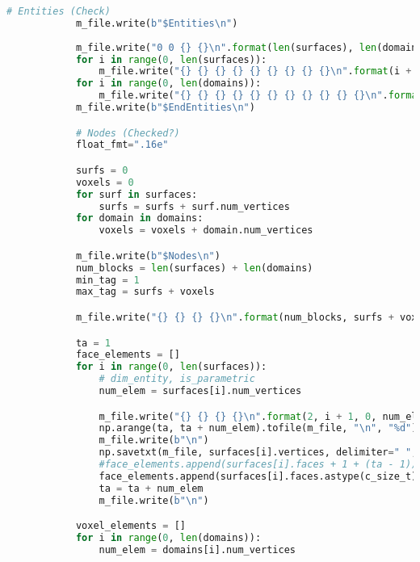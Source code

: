 \begin{lstlisting}[language=Python,caption={Class defining parsers and writers for commonly used file types. Here .gmsh and .poly are covered.},captionpos=b,label=lst:file_ops_class]
            # Entities (Check)
            m_file.write(b"$Entities\n")
            
            m_file.write("0 0 {} {}\n".format(len(surfaces), len(domains)).encode("utf-8"))
            for i in range(0, len(surfaces)):
                m_file.write("{} {} {} {} {} {} {} {} {}\n".format(i + 1, np.amin(surfaces[i].vertices[:, 0]), np.amin(surfaces[i].vertices[:, 1]), np.amin(surfaces[i].vertices[:, 2]), np.amax(surfaces[i].vertices[:, 0]), np.amax(surfaces[i].vertices[:, 1]), np.amax(surfaces[i].vertices[:, 2]), 0, 0).encode("utf-8"))
            for i in range(0, len(domains)):
                m_file.write("{} {} {} {} {} {} {} {} {} {} {}\n".format(i + 1, np.amin(domains[i].vertices[:, 0]), np.amin(domains[i].vertices[:, 1]), np.amin(domains[i].vertices[:, 2]), np.amax(domains[i].vertices[:, 0]), np.amax(domains[i].vertices[:, 1]), np.amax(domains[i].vertices[:, 2]), 1, physical_tags[i][0], 1, bounding_surface_tag[i]).encode("utf-8"))
            m_file.write(b"$EndEntities\n")

            # Nodes (Checked?)
            float_fmt=".16e"

            surfs = 0
            voxels = 0
            for surf in surfaces:
                surfs = surfs + surf.num_vertices
            for domain in domains:
                voxels = voxels + domain.num_vertices

            m_file.write(b"$Nodes\n")
            num_blocks = len(surfaces) + len(domains)
            min_tag = 1
            max_tag = surfs + voxels

            m_file.write("{} {} {} {}\n".format(num_blocks, surfs + voxels, min_tag, max_tag).encode("utf-8"))

            ta = 1
            face_elements = []
            for i in range(0, len(surfaces)):
                # dim_entity, is_parametric
                num_elem = surfaces[i].num_vertices

                m_file.write("{} {} {} {}\n".format(2, i + 1, 0, num_elem).encode("utf-8"))
                np.arange(ta, ta + num_elem).tofile(m_file, "\n", "%d")
                m_file.write(b"\n")
                np.savetxt(m_file, surfaces[i].vertices, delimiter=" ", fmt="%" + float_fmt)
                #face_elements.append(surfaces[i].faces + 1 + (ta - 1))
                face_elements.append(surfaces[i].faces.astype(c_size_t) + 1 + (ta - 1))
                ta = ta + num_elem
                m_file.write(b"\n")

            voxel_elements = []
            for i in range(0, len(domains)):
                num_elem = domains[i].num_vertices


\end{lstlisting}
